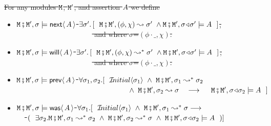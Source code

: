 \begin{definition}  \label{def:valid:assertion:time}
\sout{For any modules $\M$, $\M'$, and assertion  $\A$ we define}

\begin{itemize}
 \item\sout{
  $\M\mkpair \M', \sigma \models  \Next \A $
  \IFF
  $\exists \sigma'.\, [\ \ \M\mkpair \M',(\phi, \chi) \leadsto  \sigma' \ \wedge \M\mkpair \M',\sigma\adapt\sigma' \models \A \ \  ]$,
 \\
$\strut ~ \hspace{1.4in} $ \hfill  and where $\sigma$=$(\phi\cdot\_,\chi)$.}
\item\sout{
  $\M\mkpair \M', \sigma \models  \Future \A $
  \IFF
  $\exists \sigma'.\, [\ \ \M\mkpair \M',(\phi, \chi) \leadsto^* \sigma' \ \wedge \M\mkpair \M',\sigma\adapt\sigma' \models \A \ \  ]$,
 \\
$\strut ~ \hspace{1.4in} $   \hfill   and where $\sigma$=$(\phi\cdot\_,\chi)$.}  
  \item\sout{
 $\M\mkpair \M', \sigma \models  \Prev \A $ \IFF
 $\forall \sigma_1, \sigma_2. [\ \ \Initial{\sigma_1}\ \wedge \   \M\mkpair \M', \sigma_1  \leadsto^*  \sigma_2 $\\
 $\strut ~ \hspace{2.1in}   \wedge \   \M\mkpair \M', \sigma_2  \leadsto   \sigma  
 \ \  \ \longrightarrow \ \ \   \
 \M\mkpair \M', \sigma\adapt\sigma_2  \models \A\ \
 ]$ }
 \item\sout{
 $\M\mkpair \M', \sigma \models  \Past \A $ \IFF
%
$\forall \sigma_1. [\ \ \Initial{\sigma_1}\ \wedge \  \M\mkpair \M',\sigma_1 \leadsto^* \sigma \longrightarrow $\\
 $\strut ~ \hspace{0.1in} $   \hfill   $(\ \  \exists \sigma_2.
 \M\mkpair \M',\sigma_1 \leadsto^* \sigma_2 \ \wedge\  \M\mkpair \M',\sigma_2 \leadsto^* \sigma \ \wedge \ 
 \M\mkpair \M', \sigma\adapt\sigma_2  \models \A\ \ 
 )]$ }
\end{itemize}
\end{definition}
